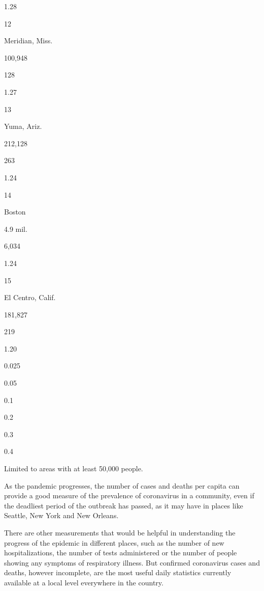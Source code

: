 1.28

12

Meridian, Miss.

100,948

128

1.27

13

Yuma, Ariz.

212,128

263

1.24

14

Boston

4.9 mil.

6,034

1.24

15

El Centro, Calif.

181,827

219

1.20

0.025

0.05

0.1

0.2

0.3

0.4

Limited to areas with at least 50,000 people.

As the pandemic progresses, the number of cases and deaths per capita
can provide a good measure of the prevalence of coronavirus in a
community, even if the deadliest period of the outbreak has passed, as
it may have in places like Seattle, New York and New Orleans.

There are other measurements that would be helpful in understanding the
progress of the epidemic in different places, such as the number of new
hospitalizations, the number of tests administered or the number of
people showing any symptoms of respiratory illness. But confirmed
coronavirus cases and deaths, however incomplete, are the most useful
daily statistics currently available at a local level everywhere in the
country.

